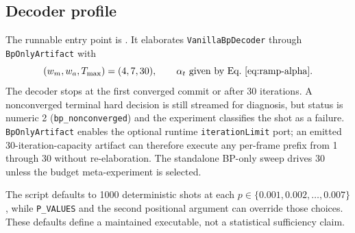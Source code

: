 \documentclass[10pt,conference]{IEEEtran}
\begin{document}
\subsection{Decoder profile}
The runnable entry point is
.  It elaborates
\texttt{VanillaBpDecoder} through \texttt{BpOnlyArtifact} with
\begin{equation}
 (w_m,w_a,T_{\max})=(4,7,30),
 \qquad \alpha_t\text{ given by Eq.~\eqref{eq:ramp-alpha}}.
 \label{eq:bp-only-profile}
\end{equation}
The decoder stops at the first converged commit or after 30 iterations.  A
nonconverged terminal hard decision is still streamed for diagnosis, but status
is numeric 2 (\texttt{bp\_nonconverged}) and the experiment classifies the shot
as a failure.  \texttt{BpOnlyArtifact} enables the optional runtime
\texttt{iterationLimit} port; an emitted 30-iteration-capacity artifact can
therefore execute any per-frame prefix from 1 through 30 without re-elaboration.
The standalone BP-only sweep drives 30 unless the budget meta-experiment is
selected.

The script defaults to 1000 deterministic shots at each
$p\in\{0.001,0.002,\ldots,0.007\}$, while \texttt{P\_VALUES} and the second
positional argument can override those choices.  These defaults define a
maintained executable, not a statistical sufficiency claim.
\end{document}
